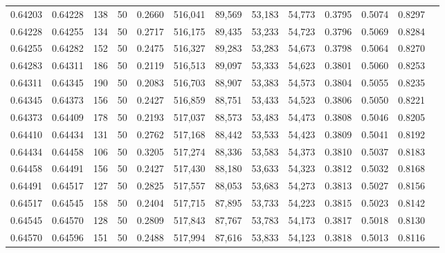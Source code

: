 \begin{tabular}{rrrrrrrrrrrrr}
0.64203 & 0.64228 &   138 &  50 &                                     0.2660 & 516,041 &  89,569 &  53,183 &  54,773 & 0.3795 & 0.5074 & 0.8297 \\
0.64228 & 0.64255 &   134 &  50 &                                     0.2717 & 516,175 &  89,435 &  53,233 &  54,723 & 0.3796 & 0.5069 & 0.8284 \\
0.64255 & 0.64282 &   152 &  50 &                                     0.2475 & 516,327 &  89,283 &  53,283 &  54,673 & 0.3798 & 0.5064 & 0.8270 \\
0.64283 & 0.64311 &   186 &  50 &                                     0.2119 & 516,513 &  89,097 &  53,333 &  54,623 & 0.3801 & 0.5060 & 0.8253 \\
0.64311 & 0.64345 &   190 &  50 &                                     0.2083 & 516,703 &  88,907 &  53,383 &  54,573 & 0.3804 & 0.5055 & 0.8235 \\
0.64345 & 0.64373 &   156 &  50 &                                     0.2427 & 516,859 &  88,751 &  53,433 &  54,523 & 0.3806 & 0.5050 & 0.8221 \\
0.64373 & 0.64409 &   178 &  50 &                                     0.2193 & 517,037 &  88,573 &  53,483 &  54,473 & 0.3808 & 0.5046 & 0.8205 \\
0.64410 & 0.64434 &   131 &  50 &                                     0.2762 & 517,168 &  88,442 &  53,533 &  54,423 & 0.3809 & 0.5041 & 0.8192 \\
0.64434 & 0.64458 &   106 &  50 &                                     0.3205 & 517,274 &  88,336 &  53,583 &  54,373 & 0.3810 & 0.5037 & 0.8183 \\
0.64458 & 0.64491 &   156 &  50 &                                     0.2427 & 517,430 &  88,180 &  53,633 &  54,323 & 0.3812 & 0.5032 & 0.8168 \\
0.64491 & 0.64517 &   127 &  50 &                                     0.2825 & 517,557 &  88,053 &  53,683 &  54,273 & 0.3813 & 0.5027 & 0.8156 \\
0.64517 & 0.64545 &   158 &  50 &                                     0.2404 & 517,715 &  87,895 &  53,733 &  54,223 & 0.3815 & 0.5023 & 0.8142 \\
0.64545 & 0.64570 &   128 &  50 &                                     0.2809 & 517,843 &  87,767 &  53,783 &  54,173 & 0.3817 & 0.5018 & 0.8130 \\
0.64570 & 0.64596 &   151 &  50 &                                     0.2488 & 517,994 &  87,616 &  53,833 &  54,123 & 0.3818 & 0.5013 & 0.8116 \\

\end{tabular}
